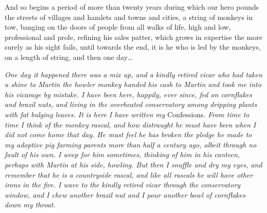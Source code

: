 And so begins a period of more than twenty years during which our hero pounds the streets of villages and hamlets and towns and cities, a string of monkeys in tow, banging on the doors of people from all walks of life, high and low, professional and prole, refining his sales patter, which grows in expertise the more surely as his sight fails, until towards the end, it is he who is led by the monkeys, on a length of string, and then one day\ldots

\emph{One day it happened there was a mix up, and a kindly retired vicar who had taken a shine to Martin the howler monkey handed his cash to Martin and took me into his vicarage by mistake. I have been here, happily, ever since, fed on cornflakes and brazil nuts, and living in the overheated conservatory among dripping plants with fat bulging leaves. It is here I have written my} Confessions. \emph{From time to time I think of the monkey rascal, and how distraught he must have been when I did not come home that day. He must feel he has broken the pledge he made to my adoptive pig farming parents more than half a century ago, albeit through no fault of his own. I weep for him sometimes, thinking of him in his canteen, perhaps with Martin at his side, howling. But then I snuffle and dry my eyes, and remember that he is a countryside rascal, and like all rascals he will have other irons in the fire. I wave to the kindly retired vicar through the conservatory window, and I chew another brazil nut and I pour another bowl of cornflakes down my throat.}
